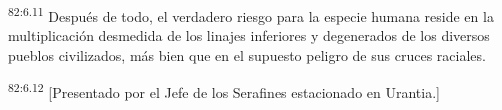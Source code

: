 \par
\textsuperscript{82:6.11} Después de todo, el verdadero riesgo para la especie humana reside en la multiplicación desmedida de los linajes inferiores y degenerados de los diversos pueblos civilizados, más bien que en el supuesto peligro de sus cruces raciales.

\par
\textsuperscript{82:6.12} [Presentado por el Jefe de los Serafines estacionado en Urantia.]